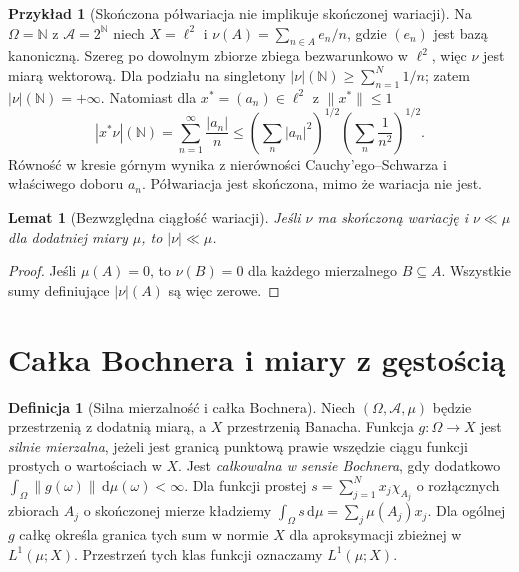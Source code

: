 \documentclass[11pt,a4paper,oneside]{book}
\numberwithin{equation}{chapter}
\theoremstyle{plain}
\newtheorem{lemat}[twierdzenie]{Lemat}
\theoremstyle{definition}
\newtheorem{definicja}[twierdzenie]{Definicja}
\newtheorem{przyklad}[twierdzenie]{Przykład}
\theoremstyle{remark}
\begin{document}
\begin{przyklad}[Skończona półwariacja nie implikuje skończonej wariacji]
\label{ex:semivariation-not-variation-30}
Na $\Omega=\mathbb N$ z $\mathcal A=2^{\mathbb N}$
niech $X=\ell^2$ i $\nu(A)=\sum_{n\in A}e_n/n$,
gdzie $(e_n)$ jest bazą kanoniczną. Szereg po dowolnym
zbiorze zbiega bezwarunkowo w $\ell^2$, więc $\nu$
jest miarą wektorową. Dla podziału na singletony
$|\nu|(\mathbb N)\ge\sum_{n=1}^{N}1/n$; zatem
$|\nu|(\mathbb N)=+\infty$.
Natomiast dla $x^*=(a_n)\in\ell^2$ z $\|x^*\|\le1$
\[
 |x^*\nu|(\mathbb N)=\sum_{n=1}^{\infty}\frac{|a_n|}{n}
 \le\left(\sum_n|a_n|^2\right)^{1/2}
 \left(\sum_n\frac1{n^2}\right)^{1/2}.
\]
Równość w kresie górnym wynika z nierówności
Cauchy'ego--Schwarza i właściwego doboru $a_n$.
Półwariacja jest skończona, mimo że wariacja nie jest.
\end{przyklad}

\begin{lemat}[Bezwzględna ciągłość wariacji]
\label{lem:vector-variation-ac-30}
Jeśli $\nu$ ma skończoną wariację i $\nu\ll\mu$
dla dodatniej miary $\mu$, to $|\nu|\ll\mu$.
\end{lemat}
\begin{proof}
Jeśli $\mu(A)=0$, to $\nu(B)=0$ dla każdego
mierzalnego $B\subseteq A$. Wszystkie sumy definiujące
$|\nu|(A)$ są więc zerowe.
\end{proof}

\section{Całka Bochnera i miary z gęstością}
\label{sec:bochner-30}
\begin{definicja}[Silna mierzalność i całka Bochnera]
\label{def:bochner-30}
Niech $(\Omega,\mathcal A,\mu)$ będzie przestrzenią
z dodatnią miarą, a $X$ przestrzenią Banacha.
Funkcja $g:\Omega\to X$ jest \emph{silnie mierzalna},
jeżeli jest granicą punktową prawie wszędzie ciągu
funkcji prostych o wartościach w $X$.
Jest \emph{całkowalna w sensie Bochnera}, gdy dodatkowo
$\int_\Omega\|g(\omega)\|\,\mathrm d\mu(\omega)<\infty$.
Dla funkcji prostej $s=\sum_{j=1}^{N}x_j\chi_{A_j}$
o rozłącznych zbiorach $A_j$ o skończonej mierze
kładziemy $\int_\Omega s\,\mathrm d\mu=\sum_j\mu(A_j)x_j$.
Dla ogólnej $g$ całkę określa granica tych sum
w normie $X$ dla aproksymacji zbieżnej w
$L^1(\mu;X)$. Przestrzeń tych klas funkcji
oznaczamy $L^1(\mu;X)$.
\end{definicja}
\end{document}
